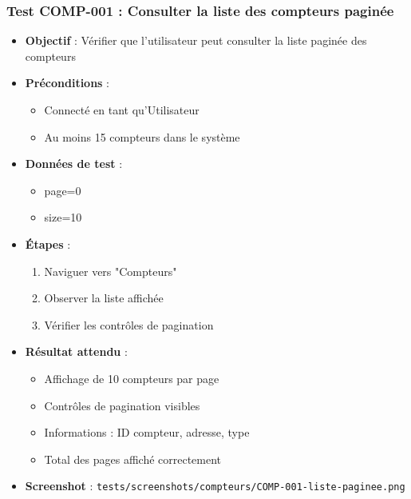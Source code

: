 \subsubsection{Test COMP-001 : Consulter la liste des compteurs paginée}
\begin{itemize}
    \item \textbf{Objectif} : Vérifier que l'utilisateur peut consulter la liste paginée des compteurs
    \item \textbf{Préconditions} : 
        \begin{itemize}
            \item Connecté en tant qu'Utilisateur
            \item Au moins 15 compteurs dans le système
        \end{itemize}
    \item \textbf{Données de test} :
        \begin{itemize}
            \item page=0
            \item size=10
        \end{itemize}
    \item \textbf{Étapes} :
        \begin{enumerate}
            \item Naviguer vers "Compteurs"
            \item Observer la liste affichée
            \item Vérifier les contrôles de pagination
        \end{enumerate}
    \item \textbf{Résultat attendu} : 
        \begin{itemize}
            \item Affichage de 10 compteurs par page
            \item Contrôles de pagination visibles
            \item Informations : ID compteur, adresse, type
            \item Total des pages affiché correctement
        \end{itemize}
    \item \textbf{Screenshot} : \texttt{tests/screenshots/compteurs/COMP-001-liste-paginee.png}
\end{itemize}

